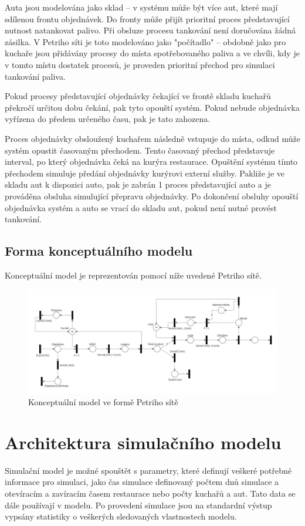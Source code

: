 \documentclass[a4paper, 11pt]{article}
\begin{document}
Auta jsou modelována jako sklad -- v systému může být více aut, které mají sdílenou frontu objednávek. Do fronty může přijít prioritní proces představující nutnost natankovat palivo. Při obsluze procesu tankování není doručována žádná zásilka. V Petriho síti je toto modelováno jako "počítadlo" -- obdobně jako pro kuchaře jsou přidávány procesy do místa spotřebovaného paliva a ve chvíli, kdy je v tomto místu dostatek procesů, je proveden prioritní přechod pro simulaci tankování paliva. 

Pokud procesy představující objednávky čekající ve frontě skladu kuchařů překročí určitou dobu čekání, pak tyto opouští systém. Pokud nebude objednávka vyřízena do předem určeného času, pak je tato zahozena. 

Proces objednávky obsloužený kuchařem následně vstupuje do místa, odkud může systém opustit časovaným přechodem. Tento časovaný přechod představuje interval, po který objednávka čeká na kurýra restaurace. Opuštění systému tímto přechodem simuluje předání objednávky kurýrovi externí služby. Pakliže je ve skladu aut k dispozici auto, pak je zabrán 1 proces představující auto a je prováděna obsluha simulující přepravu objednávky. Po dokončení obsluhy opouští objednávka systém a auto se vrací do skladu aut, pokud není nutné provést tankování. 

\newpage

\subsection{Forma konceptuálního modelu}
Konceptuální model je reprezentován pomocí níže uvedené Petriho sítě.

\begin{figure}[h]
\centering
\includegraphics[width=16cm]{petriNet}
\caption{Konceptuální model ve formě Petriho sítě}
\label{fig:1}
\end{figure}

\section{Architektura simulačního modelu}
Simulační model je možné spouštět s parametry, které definují veškeré potřebné informace pro simulaci, jako čas simulace definovaný počtem dnů simulace a otevíracím a zavíracím časem restaurace nebo počty kuchařů a aut. Tato data se dále používají v modelu. Po provedení simulace jsou na standardní výstup vypsány statistiky o veškerých sledovaných vlastnostech modelu.
\end{document}
